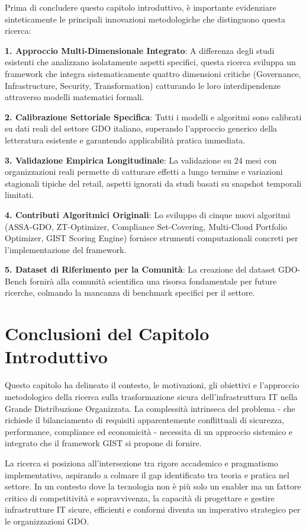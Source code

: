 Prima di concludere questo capitolo introduttivo, è importante evidenziare sinteticamente le principali innovazioni metodologiche che distinguono questa ricerca:

\textbf{1. Approccio Multi-Dimensionale Integrato}: A differenza degli studi esistenti che analizzano isolatamente aspetti specifici, questa ricerca sviluppa un framework che integra sistematicamente quattro dimensioni critiche (Governance, Infrastructure, Security, Transformation) catturando le loro interdipendenze attraverso modelli matematici formali.

\textbf{2. Calibrazione Settoriale Specifica}: Tutti i modelli e algoritmi sono calibrati su dati reali del settore GDO italiano, superando l'approccio generico della letteratura esistente e garantendo applicabilità pratica immediata.

\textbf{3. Validazione Empirica Longitudinale}: La validazione su 24 mesi con organizzazioni reali permette di catturare effetti a lungo termine e variazioni stagionali tipiche del retail, aspetti ignorati da studi basati su snapshot temporali limitati.

\textbf{4. Contributi Algoritmici Originali}: Lo sviluppo di cinque nuovi algoritmi (ASSA-GDO, ZT-Optimizer, Compliance Set-Covering, Multi-Cloud Portfolio Optimizer, GIST Scoring Engine) fornisce strumenti computazionali concreti per l'implementazione del framework.

\textbf{5. Dataset di Riferimento per la Comunità}: La creazione del dataset GDO-Bench fornirà alla comunità scientifica una risorsa fondamentale per future ricerche, colmando la mancanza di benchmark specifici per il settore.

\section{Conclusioni del Capitolo Introduttivo}

Questo capitolo ha delineato il contesto, le motivazioni, gli obiettivi e l'approccio metodologico della ricerca sulla trasformazione sicura dell'infrastruttura IT nella Grande Distribuzione Organizzata. La complessità intrinseca del problema - che richiede il bilanciamento di requisiti apparentemente conflittuali di sicurezza, performance, compliance ed economicità - necessita di un approccio sistemico e integrato che il framework GIST si propone di fornire.

La ricerca si posiziona all'intersezione tra rigore accademico e pragmatismo implementativo, aspirando a colmare il gap identificato tra teoria e pratica nel settore. In un contesto dove la tecnologia non è più solo un enabler ma un fattore critico di competitività e sopravvivenza, la capacità di progettare e gestire infrastrutture IT sicure, efficienti e conformi diventa un imperativo strategico per le organizzazioni GDO.

